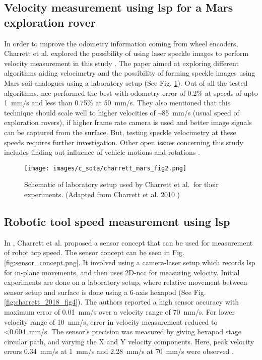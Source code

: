     \subsection{Velocity measurement using \gls{lsp} for a Mars exploration rover}
        In order to improve the odometry information coming from wheel encoders, Charrett et al. explored the possibility of using laser speckle images to perform velocity measurement in this study \cite{charrett_mars}. The paper aimed at exploring different algorithms aiding velocimetry and the possibility of forming speckle images using Mars soil analogues using a laboratory setup (See Fig. \ref{fig:charrett_mars_fig2.png}). Out of all the tested algorithms, \gls{ncc} performed the best with odometry error of 0.2\% at speeds of upto \SI{1}{\milli\meter/\second} and less than 0.75\% at \SI{50}{\milli\meter/\second}. They also mentioned that this technique should scale well to higher velocities of \sim\SI{85}{\milli\meter/\second} (usual speed of exploration rovers), if higher frame rate camera is used and better image signals can be captured from the surface. But, testing speckle velocimetry at these speeds requires further investigation. Other open issues concerning this study includes finding out influence of vehicle motions and rotations \cite{charrett_mars}.

        \begin{figure}[ht]
            \centering
            \texttt{[image: images/c\_sota/charrett\_mars\_fig2.png]}
            \caption{Schematic of laboratory setup used by Charrett et al.\ for their experiments. (Adapted from Charrett et al. 2010 \cite{charrett_mars})}
            \label{fig:charrett_mars_fig2.png}
        \end{figure}
        
    \subsection{Robotic tool speed measurement using \gls{lsp}} \label{subsection:robotic_tool_speed}
        In \cite{charrett_2018}, Charrett et al. proposed a sensor concept that can be used for measurement of robot \gls{tcp} speed. The sensor concept can be seen in Fig. \ref{fig:sensor_concept.png}. It involved using a camera-laser setup which records \gls{lsp} for in-plane movements, and then uses 2D-\gls{ncc} for measuring velocity. Initial experiments are done on a laboratory setup, where relative movement between sensor setup and surface is done using a 6-axis hexapod (See Fig. \ref{fig:charrett_2018_fig4}). The authors reported a high sensor accuracy with maximum error of \pm\SI{0.01}{\milli\meter/\second} over a velocity range of \pm\SI{70}{\milli\meter/\second}. For lower velocity range of \pm\SI{10}{\milli\meter/\second}, error in velocity measurement reduced to \textless \SI{0.004}{\milli\meter/\second}. The sensor's precision was measured by giving hexapod stage circular path, and varying the X and Y velocity components. Here, peak velocity errors \SI{0.34}{\milli\meter/\second} at \SI{1}{\milli\meter/\second} and \pm\SI{2.28}{\milli\meter/\second} at \pm\SI{70}{\milli\meter/\second} were observed \cite{charrett_2018}.
        

